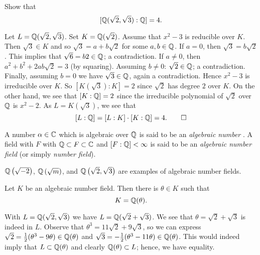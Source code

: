 
\begin{problem}
	Show that
	\[
		[\mathbb{Q}(\sqrt 2, \sqrt 3) : \mathbb{Q}] = 4.
	\]
\end{problem}

\begin{solution}
	Let $L = \mathbb{Q}(\sqrt 2, \sqrt 3)$.
	Set $K = \mathbb{Q}(\sqrt 2)$.
	Assume that $x^2 - 3$ is reducible over $K$.
	Then $\sqrt 3 \in K$ and so $\sqrt 3 = a + b \sqrt 2$
	for some $a, b \in \mathbb{Q}$.
	If $a = 0$, then $\sqrt 3 = b \sqrt 2$.
	This implies that $\sqrt 6 = b2 \in \mathbb{Q}$;
	a contradiction.
	If $a \neq 0$, then $a^2 + b^2 + 2ab\sqrt 2 = 3$
	(by squaring).
	Assuming $b \neq 0$: $\sqrt 2 \in \mathbb{Q}$; a contradiction.
	Finally, assuming $b = 0$ we have $\sqrt 3 \in \mathbb{Q}$,
	again a contradiction.
	Hence $x^2 - 3$ is irreducible over $K$.
	So $[K(\sqrt 3): K] = 2$ since $\sqrt 2$ has degree $2$
	over $K$.
	On the other hand, we see that $[K : \mathbb{Q}] = 2$ since 
	the irreducible polynomial of $\sqrt 2$ over $\mathbb{Q}$ is $x^2 - 2$.
	As $L = K(\sqrt 3)$, we see that
	\[
		[L: \mathbb{Q}] = [L:K] \cdot [K:\mathbb{Q}] = 4. \qedhere
	\]
\end{solution}

\begin{definition}[Algebraic]
	A number $\alpha \in \mathbb{C}$ which is algebraic over $\mathbb{Q}$ is said to be
	an \emph{algebraic number} .
	A field with $F$ with 
	$\mathbb{Q} \subset F \subset \mathbb{C}$
	and
	$[F : \mathbb{Q}] < \infty$
	is said to be an \emph{algebraic number field}
	(or simply \emph{number field}).
\end{definition}

\begin{example}
	$\mathbb{Q}\left( \sqrt{-2} \right)$,
	$\mathbb{Q}\left( \sqrt m \right)$,
	and $\mathbb{Q}\left( \sqrt 2, \sqrt 3 \right)$
	are examples of algebraic number fields.
\end{example}

\begin{theorem}
	Let $K$ be an algebraic number field.
	Then there is $\theta \in K$ such that
	\[
		K = \mathbb{Q}(\theta).
	\]
\end{theorem}

\begin{example}[]
	With $L = \mathbb{Q}(\sqrt 2, \sqrt 3)$ we have
	$L = \mathbb{Q}(\sqrt 2 + \sqrt 3)$.
	We see that $\theta = \sqrt 2 + \sqrt 3$
	is indeed in $L$.
	Observe that $\theta^3 = 11\sqrt 2 + 9\sqrt 3$,
	so we can express
	$\sqrt 2 = \frac12 (\theta^3 - 9\theta) \in \mathbb{Q}(\theta)$
	and
	$\sqrt 3 = -\frac12 (\theta^3 - 11\theta) \in \mathbb{Q}(\theta)$.
	This would indeed imply that $L \subset \mathbb{Q}(\theta)$
	and clearly $\mathbb{Q}(\theta) \subset L$;
	hence, we have equality.
\end{example}

